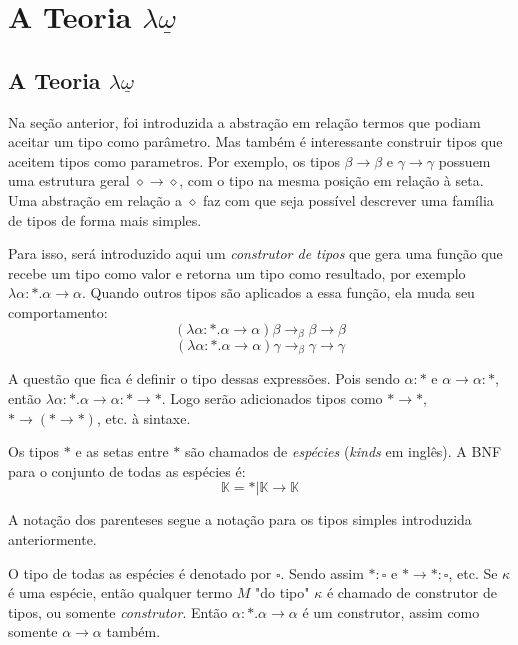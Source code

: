 \documentclass[../main.tex]{subfiles}
\begin{document}
\section{A Teoria \texorpdfstring{$\lambda\underline{\omega}$}{lambda omega}}

\subsection{A Teoria \texorpdfstring{$\lambda\underline{\omega}$}{lambda omega}}

Na seção anterior, foi introduzida a abstração em relação termos que podiam aceitar um tipo como parâmetro. Mas também é interessante construir tipos que aceitem tipos como parametros. Por exemplo, os tipos $\beta \to \beta$ e $\gamma \to \gamma$ possuem uma estrutura geral $\diamond \to \diamond$, com o tipo na mesma posição em relação à seta. Uma abstração em relação a $\diamond$ faz com que seja possível descrever uma família de tipos de forma mais simples.

Para isso, será introduzido aqui um \emph{construtor de tipos} que gera uma função que recebe um tipo como valor e retorna um tipo como resultado, por exemplo $\lambda \alpha : \ast . \alpha \to \alpha$. Quando outros tipos são aplicados a essa função, ela muda seu comportamento: $$(\lambda \alpha : \ast . \alpha \to \alpha) \beta \to_{\beta} \beta \to \beta $$ $$ (\lambda \alpha : \ast . \alpha \to \alpha) \gamma \to_{\beta} \gamma \to \gamma$$

A questão que fica é definir o tipo dessas expressões. Pois sendo $\alpha : \ast$ e $\alpha \to \alpha : \ast$, então $\lambda \alpha : \ast . \alpha \to \alpha : \ast \to \ast$. Logo serão adicionados tipos como $\ast \to \ast$, $\ast \to (\ast \to \ast)$, etc. à sintaxe.

Os tipos $\ast$ e as setas entre $\ast$ são chamados de \emph{espécies} (\emph{kinds} em inglês). A BNF para o conjunto de todas as espécies é: $$\mathbb{K} = \ast | \mathbb{K} \to \mathbb{K}$$

A notação dos parenteses segue a notação para os tipos simples introduzida anteriormente.

O tipo de todas as espécies é denotado por $\square$. Sendo assim $\ast : \square$ e $\ast \to \ast : \square$, etc. Se $\kappa$ é uma espécie, então qualquer termo $M$ "do tipo" $\kappa$ é chamado de construtor de tipos, ou somente \emph{construtor}. Então $\alpha : \ast . \alpha \to \alpha$ é um construtor, assim como somente $\alpha \to \alpha$ também.
\end{document}
